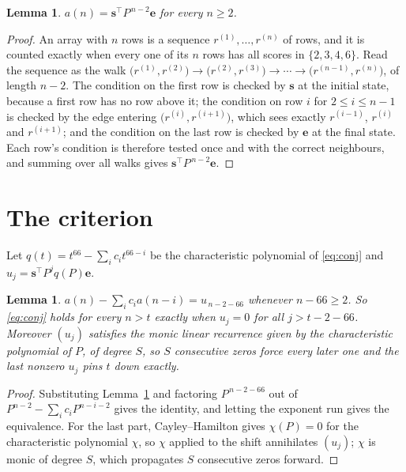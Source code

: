 \documentclass[11pt,a4paper]{article}
\theoremstyle{plain}
\newtheorem{lemma}[theorem]{Lemma}
\theoremstyle{definition}
\begin{document}
\begin{lemma}\label{lem:walk}
$a(n)=\mathbf{s}^{\!\top}P^{\,n-2}\mathbf{e}$ for every $n\ge2$.
\end{lemma}

\begin{proof}
An array with $n$ rows is a sequence $r^{(1)},\dots,r^{(n)}$ of rows, and it is counted
exactly when every one of its $n$ rows has all scores in $\{2,3,4,6\}$. Read the sequence as the
walk $\bigl(r^{(1)},r^{(2)}\bigr)\to\bigl(r^{(2)},r^{(3)}\bigr)\to\cdots\to
\bigl(r^{(n-1)},r^{(n)}\bigr)$, of length $n-2$. The condition on the first row is
checked by $\mathbf{s}$ at the initial state, because a first row has no row above it; the
condition on row $i$ for $2\le i\le n-1$ is checked by the edge entering
$\bigl(r^{(i)},r^{(i+1)}\bigr)$, which sees exactly $r^{(i-1)}$, $r^{(i)}$ and
$r^{(i+1)}$; and the condition on the last row is checked by $\mathbf{e}$ at the final
state. Each row's condition is therefore tested once and with the correct neighbours, and
summing over all walks gives $\mathbf{s}^{\!\top}P^{\,n-2}\mathbf{e}$.
\end{proof}

\section{The criterion}

Let $q(t)=t^{66}-\sum_i c_i t^{66-i}$ be the characteristic polynomial of
\eqref{eq:conj} and $u_j=\mathbf{s}^{\!\top}P^{j}q(P)\mathbf{e}$.

\begin{lemma}\label{lem:crit}
$a(n)-\sum_i c_i a(n-i)=u_{\,n-2-66}$ whenever $n-66\ge2$. So \eqref{eq:conj}
holds for every $n>t$ exactly when $u_j=0$ for all $j>t-2-66$. Moreover $(u_j)$
satisfies the monic linear recurrence given by the characteristic polynomial of $P$, of
degree $S$, so $S$ consecutive zeros force every later one and the last nonzero $u_j$ pins
$t$ down exactly.
\end{lemma}

\begin{proof}
Substituting Lemma~\ref{lem:walk} and factoring $P^{\,n-2-66}$ out of
$P^{n-2}-\sum_i c_i P^{n-i-2}$ gives the identity, and letting the exponent run gives the
equivalence. For the last part, Cayley--Hamilton gives $\chi(P)=0$ for the characteristic
polynomial $\chi$, so $\chi$ applied to the shift annihilates $(u_j)$; $\chi$ is monic of
degree $S$, which propagates $S$ consecutive zeros forward.
\end{proof}
\end{document}

